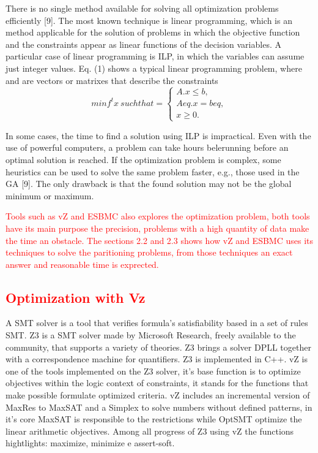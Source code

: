 There is no single method available for solving all optimization problems efficiently [9]. The most known technique is linear programming, which is an method applicable for the solution of problems in which the objective function and the constraints appear as linear functions of the decision variables. A particular case of linear programming is ILP, in which the variables can assume just integer values. Eq. (1) shows a typical linear programming problem, where  and  are vectors or matrixes that describe the constraints
\begin{equation}
  minf^t x \: such that  = 
  \begin{cases}
    A.x \leq b, \\ 
    Aeq.x = beq, \\ 
    x \geq 0.
  \end{cases}
\end{equation}

In some cases, the time to find a solution using ILP is impractical. Even with the use of powerful computers, a problem can take hours belerunning before an optimal solution is reached. If the optimization problem is complex, some heuristics can be used to solve the same problem faster, e.g., those used in the GA [9]. The only drawback is that the found solution may not be the global minimum or maximum.

\textcolor{red}{Tools such as vZ and ESBMC also explores the optimization problem, both tools have its main purpose the precision, problems with a high quantity of data make the time an obstacle. The sections 2.2 and 2.3 shows how vZ and ESBMC uses its techniques to solve the paritioning problems, from those techniques an exact answer and reasonable time is exprected.}


\subsection{\textcolor{Red}{Optimization with Vz}}

A SMT solver is a tool that verifies formula's satisfiability based in a set of rules SMT. Z3 is a SMT solver made by Microsoft Research, freely available to the community, that supports a variety of theories. Z3 brings a solver DPLL together with a correspondence machine for quantifiers. Z3 is implemented in C++.
vZ is one of the tools implemented on the Z3 solver, it's base function is to optimize objectives within the logic context of constraints, it stands for the functions that make possible formulate optimized criteria.
vZ includes an incremental version of MaxRes to MaxSAT and a Simplex to solve numbers without defined patterns, in it's core MaxSAT is responsible to the restrictions while OptSMT optimize the linear arithmetic objectives.
Among all progress of Z3 using vZ the functions hightlights: maximize, minimize e assert-soft.

